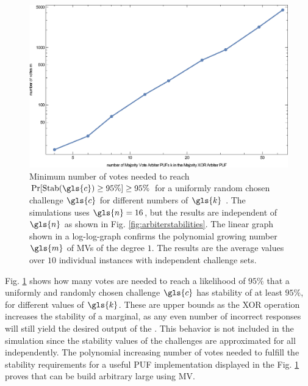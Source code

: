 \begin{figure}[ht]
\includegraphics[width=1.00\textwidth]{images/votes-stab-simulation.eps}
\caption[Minimum number of votes need for large \mxpuf]{Minimum number of votes needed to reach $\Pr[\protect\Stab(\gls{c}) \ge 95 \%] \ge 95 \%$ for a uniformly random chosen challenge $\gls{c}$ for different numbers of $\gls{k}$ \apufs. 
The simulations uses $\gls{n} = 16$, but the results are independent of $\gls{n}$ as shown in Fig. \ref{fig:arbiterstabilities}. 
The linear graph shown in a log-log-graph confirms the polynomial growing number $\gls{m}$ of \acp{MV} of the degree $1$.
The results are the average values over $10$ individual \puf instances with independent challenge sets.} 
\label{fig:majorityvotegrowth}
\end{figure}

Fig. \ref{fig:majorityvotegrowth} shows how many votes are needed to reach a likelihood of $95 \%$ that a uniformly and randomly chosen challenge $\gls{c}$ has stability of at least $95 \%$, for different values of $\gls{k}$.
These are upper bounds as the \ac{XOR} operation increases the stability of a \xpuf marginal, as any even number of incorrect \apuf responses will still yield the desired output of the \xpuf. 
This behavior is not included in the simulation since the stability values of the challenges are approximated for all \apufs independently.
The polynomial increasing number of votes needed to fulfill the stability requirements for a useful PUF implementation displayed in the Fig. \ref{fig:majorityvotegrowth} proves that \xpufs can be build arbitrary large using \ac{MV}.


